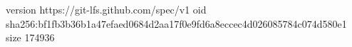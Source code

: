 version https://git-lfs.github.com/spec/v1
oid sha256:bf1fb3b36b1a47efaed0684d2aa17f0e9fd6a8eccec4d026085784c074d580e1
size 174936
